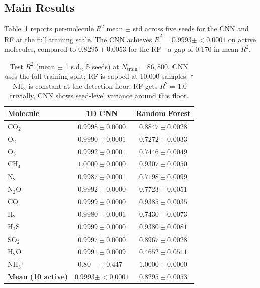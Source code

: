 \documentclass[11pt]{article}
\begin{document}
\subsection{Main Results}

Table~\ref{tab:main} reports per-molecule $R^2$ mean $\pm$ std across five
seeds for the CNN and RF at the full training scale. The CNN achieves
$\bar{R}^2 = 0.9993 \pm {<}0.0001$ on active molecules, compared to
$0.8295 \pm 0.0053$ for the RF—a gap of 0.170 in mean $R^2$.

\begin{table}[t]
  \centering
  \caption{Test $R^2$ (mean $\pm$ 1 s.d., 5 seeds) at $N_{\text{train}} = 86{,}800$.
           CNN uses the full training split; RF is capped at 10{,}000 samples.
           $\dagger$\,NH$_3$ is constant at the detection floor; RF gets $R^2=1.0$
           trivially, CNN shows seed-level variance around this floor.
           \label{tab:main}}
  \smallskip
  \setlength{\tabcolsep}{6pt}
  \begin{tabular}{lcc}
    \toprule
    Molecule & 1D CNN & Random Forest \\
    \midrule
    CO$_2$   & $0.9998 \pm 0.0000$ & $0.8847 \pm 0.0028$ \\
    O$_2$    & $0.9990 \pm 0.0001$ & $0.7272 \pm 0.0033$ \\
    O$_3$    & $0.9992 \pm 0.0001$ & $0.7446 \pm 0.0049$ \\
    CH$_4$   & $1.0000 \pm 0.0000$ & $0.9307 \pm 0.0050$ \\
    N$_2$    & $0.9987 \pm 0.0001$ & $0.7198 \pm 0.0099$ \\
    N$_2$O   & $0.9992 \pm 0.0000$ & $0.7723 \pm 0.0051$ \\
    CO       & $0.9999 \pm 0.0000$ & $0.9385 \pm 0.0035$ \\
    H$_2$    & $0.9980 \pm 0.0001$ & $0.7430 \pm 0.0073$ \\
    H$_2$S   & $0.9999 \pm 0.0000$ & $0.9380 \pm 0.0081$ \\
    SO$_2$   & $0.9997 \pm 0.0000$ & $0.8967 \pm 0.0028$ \\
    \midrule
    H$_2$O   & $0.9991 \pm 0.0009$ & $0.4652 \pm 0.0511$ \\
    NH$_3$$^\dagger$ & $0.80\phantom{00} \pm 0.447\phantom{0}$ & $1.0000 \pm 0.0000$ \\
    \midrule
    \textbf{Mean (10 active)} & $\mathbf{0.9993 \pm {<}0.0001}$ & $\mathbf{0.8295 \pm 0.0053}$ \\
    \bottomrule
  \end{tabular}
\end{table}
\end{document}
